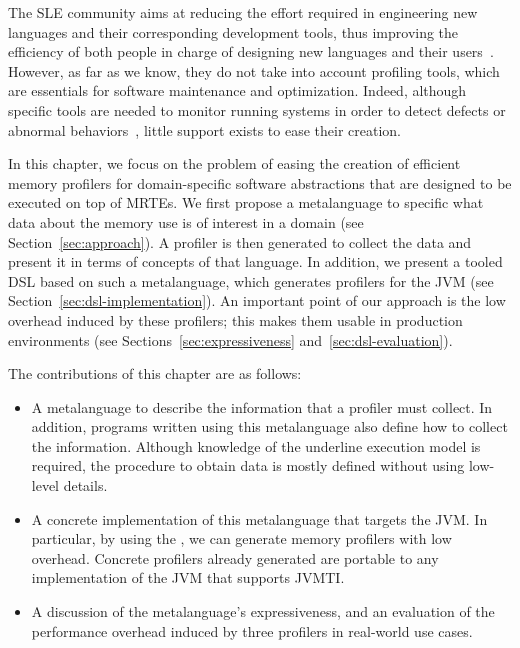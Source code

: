
The \gls{SLE} community aims at reducing the effort required in engineering new languages and their corresponding development tools, thus improving the efficiency of both people in charge of designing new languages and their users~\cite{sle}. 
However, as far as we know, they do not take into account profiling tools, which are essentials for software maintenance and optimization.
Indeed, although specific tools are needed to monitor running systems in order to detect defects or abnormal behaviors~\cite{duesterwald2000software, Jovic:2011:CMY:2076021.2048081},
little support exists to ease their creation.

In this chapter, we focus on the problem of easing the creation of efficient memory profilers for domain-specific software abstractions that are designed to be executed on top of MRTEs. 
We first propose a metalanguage to specific what data about the memory use is of interest in a domain (see Section~\ref{sec:approach}).
A profiler is then generated to collect the data and present it in terms of concepts of that language. 
In addition, we present a tooled DSL based on such a metalanguage, which generates profilers for the JVM (see Section~\ref{sec:dsl-implementation}).
An important point of our approach is the low overhead induced by these profilers; this makes them usable in production environments (see Sections~\ref{sec:expressiveness} and~\ref{sec:dsl-evaluation}).

The contributions of this chapter are as follows:
\begin{itemize}
\item A metalanguage to describe the information that a profiler must collect.
In addition, programs written using this metalanguage also define how to collect the information.
Although knowledge of the underline execution model is required, the procedure to obtain data is mostly defined without using low-level details.  

\item A concrete implementation of this metalanguage that targets the JVM.
In particular, by using the , we can generate memory profilers with low overhead.
Concrete profilers already generated are portable to any implementation of the JVM that supports JVMTI.

\item A discussion of the metalanguage's expressiveness, and an evaluation of the performance overhead induced by three profilers in real-world use cases.
\end{itemize}
